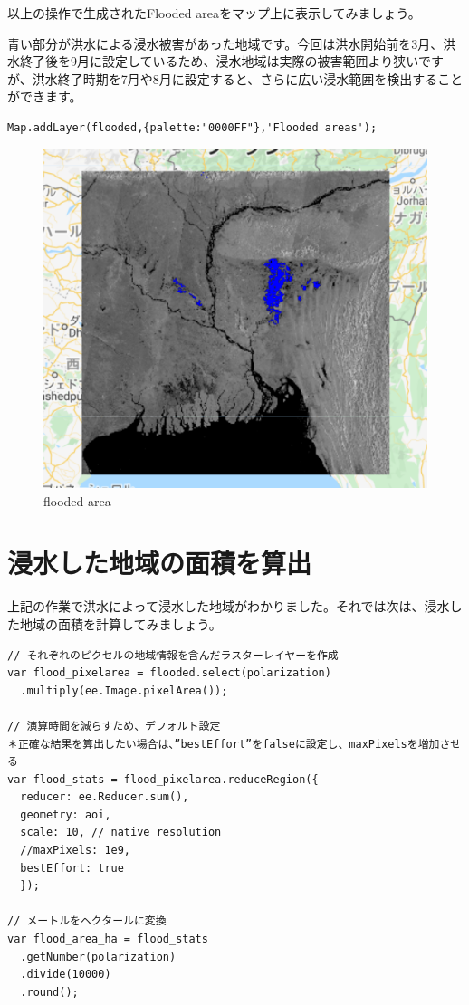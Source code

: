 \documentclass[
]{book}
\begin{document}
以上の操作で生成されたFlooded areaをマップ上に表示してみましょう。

青い部分が洪水による浸水被害があった地域です。今回は洪水開始前を3月、洪水終了後を9月に設定しているため、浸水地域は実際の被害範囲より狭いですが、洪水終了時期を7月や8月に設定すると、さらに広い浸水範囲を検出することができます。

\begin{verbatim}
Map.addLayer(flooded,{palette:"0000FF"},'Flooded areas');
\end{verbatim}

\begin{figure}
\centering
\includegraphics{images/flooded.png}
\caption{flooded area}
\end{figure}

\hypertarget{ux6d78ux6c34ux3057ux305fux5730ux57dfux306eux9762ux7a4dux3092ux7b97ux51fa}{%
\section{浸水した地域の面積を算出}\label{ux6d78ux6c34ux3057ux305fux5730ux57dfux306eux9762ux7a4dux3092ux7b97ux51fa}}

上記の作業で洪水によって浸水した地域がわかりました。それでは次は、浸水した地域の面積を計算してみましょう。

\begin{verbatim}
// それぞれのピクセルの地域情報を含んだラスターレイヤーを作成 
var flood_pixelarea = flooded.select(polarization)
  .multiply(ee.Image.pixelArea());

// 演算時間を減らすため、デフォルト設定
＊正確な結果を算出したい場合は、”bestEffort”をfalseに設定し、maxPixelsを増加させる
var flood_stats = flood_pixelarea.reduceRegion({
  reducer: ee.Reducer.sum(),              
  geometry: aoi,
  scale: 10, // native resolution 
  //maxPixels: 1e9,
  bestEffort: true
  });

// メートルをヘクタールに変換  
var flood_area_ha = flood_stats
  .getNumber(polarization)
  .divide(10000)
  .round(); 
\end{verbatim}
\end{document}

